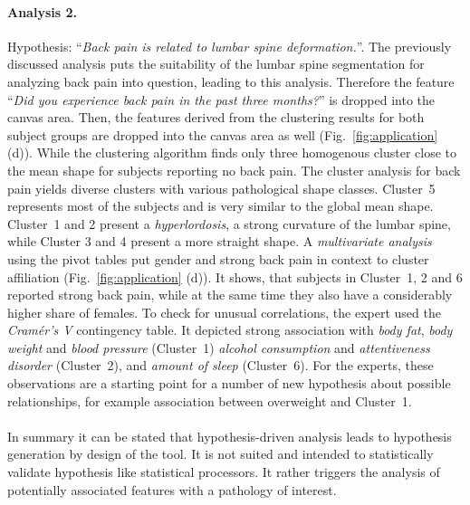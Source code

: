 \documentclass[journal]{style/vgtc} 			          %
\begin{document}
\paragraph{Analysis 2.}
Hypothesis: ``\emph{Back pain is related to lumbar spine deformation.}''.
%
The previously discussed analysis puts the suitability of the lumbar spine segmentation for analyzing back pain into question, leading to this analysis.
%
Therefore the feature ``\emph{Did you experience back pain in the past three months?}'' is dropped into the canvas area.%
%
Then, the features derived from the clustering results for both subject groups are dropped into the canvas area as well (Fig.~\ref{fig:application} (d)).
%
While the clustering algorithm finds only three homogenous cluster close to the mean shape for subjects reporting no back pain.
%
The cluster analysis for back pain yields diverse clusters with various pathological shape classes.
%
Cluster~5 represents most of the subjects and is very similar to the global mean shape.
%
Cluster~1 and 2 present a \emph{hyperlordosis}, a strong curvature of the lumbar spine, while Cluster 3 and 4 present a more straight shape.
%
A \emph{multivariate analysis} using the pivot tables put gender and strong back pain in context to cluster affiliation (Fig.~\ref{fig:application} (d)). 
%
It shows, that subjects in Cluster~1, 2 and 6 reported strong back pain, while at the same time they also have a considerably higher share of females.
%
To check for unusual correlations, the expert used the \emph{Cram\'{e}r's V} contingency table.
%
It depicted strong association with \emph{body fat}, \emph{body weight} and \emph{blood pressure} (Cluster~1) \emph{alcohol consumption} and \emph{attentiveness disorder} (Cluster~2), and \emph{amount of sleep} (Cluster~6).
%
For the experts, these observations are a starting point for a number of new hypothesis about possible relationships, for example association between overweight and Cluster~1.
%
\\\\
In summary it can be stated that hypothesis-driven analysis leads to hypothesis generation by design of the tool.
%
It is not suited and intended to statistically validate hypothesis like statistical processors.
%
It rather triggers the analysis of potentially associated features with a pathology of interest.
%
\end{document}
